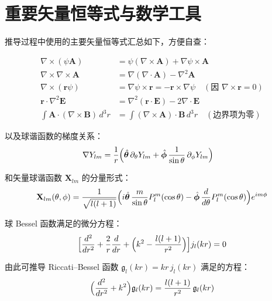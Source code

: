 \section{重要矢量恒等式与数学工具}

推导过程中使用的主要矢量恒等式汇总如下，方便自查：

\begin{align}
  \nabla\times(\psi\mathbf{A}) &= \psi(\nabla\times\mathbf{A}) + \nabla\psi\times\mathbf{A} \label{eq:vec1}\\
  \nabla\times\nabla\times\mathbf{A} &= \nabla(\nabla\cdot\mathbf{A}) - \nabla^2\mathbf{A} \label{eq:vec2}\\
  \nabla\times(\mathbf{r}\psi) &= \nabla\psi\times\mathbf{r} = -\mathbf{r}\times\nabla\psi \quad (\text{因 }\nabla\times\mathbf{r}=0) \label{eq:vec3}\\
  \mathbf{r}\cdot\nabla^2\mathbf{E} &= \nabla^2(\mathbf{r}\cdot\mathbf{E}) - 2\nabla\cdot\mathbf{E} \label{eq:vec4}\\
  \int \mathbf{A}\cdot(\nabla\times\mathbf{B})\,d^3r &= \int (\nabla\times\mathbf{A})\cdot\mathbf{B}\,d^3r
    \quad (\text{边界项为零}) \label{eq:vec5}
\end{align}

以及球谐函数的梯度关系：
\begin{align}
  \nabla Y_{lm} &= \frac{1}{r}\Bigl(\hat{\boldsymbol{\theta}}\,\partial_\theta Y_{lm}
    + \hat{\boldsymbol{\phi}}\,\frac{1}{\sin\theta}\,\partial_\phi Y_{lm}\Bigr) \label{eq:gradY}
\end{align}

和矢量球谐函数 $\mathbf{X}_{lm}$ 的分量形式：
$$
\mathbf{X}_{lm}(\theta,\phi) = \frac{1}{\sqrt{l(l+1)}}\Bigl(
  i\hat{\boldsymbol{\theta}}\,\frac{m}{\sin\theta}P_l^m(\cos\theta)
  - \hat{\boldsymbol{\phi}}\,\frac{d}{d\theta}P_l^m(\cos\theta)
\Bigr)e^{im\phi}
$$

球 Bessel 函数满足的微分方程：
$$
\Bigl[\frac{d^2}{dr^2} + \frac{2}{r}\frac{d}{dr} + \Bigl(k^2 - \frac{l(l+1)}{r^2}\Bigr)\Bigr] j_l(kr) = 0
$$

由此可推导 Riccati--Bessel 函数 $\mathfrak{g}_l(kr)=kr\,j_l(kr)$ 满足的方程：
$$
\Bigl(\frac{d^2}{dr^2} + k^2\Bigr)\mathfrak{g}_l(kr) = \frac{l(l+1)}{r^2}\,\mathfrak{g}_l(kr)
$$

\vspace{1em}
\begin{center}
\end{center}

